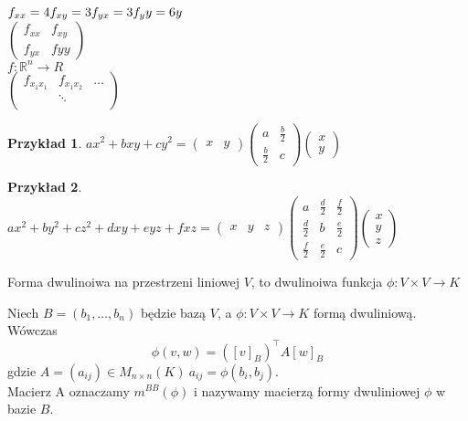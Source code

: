 \documentclass[10pt]{article}
\theoremstyle{definition}
\theoremstyle{definition}
\theoremstyle{definition}
\theoremstyle{definition}
\theoremstyle{remark}
\theoremstyle{definition}
\theoremstyle{definition}
\theoremstyle{definition}
\theoremstyle{definition}
\newtheorem*{prz}{Przykład}
\theoremstyle{definition}
\begin{document}
$ f_{xx} = 4 \\ f_{xy} = 3 \\ f_{yx} = 3 \\ f_yy = 6y$ \\
$\begin{pmatrix} 
    f_{xx} & f_{xy} \\ f_{yx} & f{yy} 
\end{pmatrix}$ \\ 
$f: \mathbb R^n \to R$\\ 
$\begin{pmatrix} 
    f_{x_1 x_1} & f_{x_1 x_2} & \ldots \\ 
        & \ddots & \\ 
        & & 
\end{pmatrix}$ 
\begin{prz} 
    $a x^2 + b xy + cy^2 = \begin{pmatrix} x & y \end{pmatrix}
    \begin{pmatrix} a & \frac{b}{2} \\ \frac{b}{2} & c \end{pmatrix} 
    \begin{pmatrix} x \\ y \end{pmatrix}$
\end{prz} 
\begin{prz} 
    $a x^2 + by^2 + cz^2 + dxy + eyz + fxz = 
    \begin{pmatrix} x & y & z \end{pmatrix} 
    \begin{pmatrix} a & \frac{d}{2} & \frac{f}{2} \\ 
                    \frac{d}{2} & b & \frac{e}{2} \\ 
                \frac{f}{2} & \frac{e}{2} & c \end{pmatrix} 
    \begin{pmatrix} x \\ y \\ z \end{pmatrix} $
\end{prz} 
\begin{df} 
    Forma dwulinoiwa na przestrzeni liniowej $V$, to dwulinoiwa funkcja $\phi: V \times 
    V \to K$
\end{df}
\begin{ft} 
    Niech $B = (b_1,\ldots,b_n)$ będzie bazą $V$, a $\phi: V \times V \to K$ formą
    dwuliniową. Wówczas \[ \phi(v,w) = ([v]_B)^\top A [w]_B\] gdzie $A = (a_{ij}) 
    \in M_{n \times n} (K) \ a_{ij} = \phi(b_i,b_j)$. \\ 
    Macierz A oznaczamy $m^{BB}(\phi)$ i nazywamy macierzą formy dwuliniowej $\phi$ 
    w bazie $B$.
\end{ft} 
\end{document}
